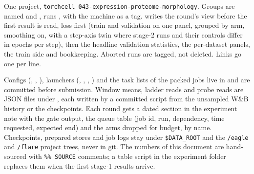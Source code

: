 One project, \texttt{torchcell\_043-expression-proteome-morphology}. Groups are named
 and ,
runs , with the machine as a tag.  writes the
round's view before the first result is read, loss first (train and validation on one panel,
grouped by arm, smoothing on, with a step-axis twin where stage-2 runs and their controls differ
in epochs per step), then the headline validation statistics, the per-dataset panels, the train
side and bookkeeping. Aborted runs are tagged, not deleted. Links go one per line.

Configs (, , ),
launchers (, , ,
) and the task lists of the packed jobs live in
 and are committed before submission.
Window means, ladder reads and probe reads are JSON files under , each written by
a committed script from the unsampled W\&B history or the checkpoints. Each round gets a dated
section in the experiment note with the gate output, the queue table (job id, run, dependency,
time requested, expected end) and the arms dropped for budget, by name. Checkpoints, prepared
stores and job logs stay under \texttt{\$DATA\_ROOT} and the \texttt{/eagle} and \texttt{/flare}
project trees, never in git. The numbers of this document are hand-sourced with
\texttt{\%\% SOURCE} comments; a table script in the experiment folder replaces them when the
first stage-1 results arrive.
